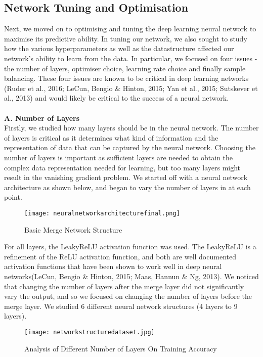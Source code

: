 \documentclass{article}
\begin{document}
\subsection{Network Tuning and Optimisation}
Next, we moved on to optimising and tuning the deep learning neural network to maximise its predictive ability. In tuning our network, we also sought to study how the various hyperparameters as well as the datastructure affected our network's ability to learn from the data. In particular, we focused on four issues - the number of layers, optimiser choice, learning rate choice and finally sample balancing. These four issues are known to be critical in deep learning networks (Ruder et al., 2016; LeCun, Bengio \& Hinton, 2015; Yan et al., 2015;  Sutskever et al., 2013) and would likely be critical to the success of a neural network.\\\\
\textbf{A. Number of Layers} \\
Firstly, we studied how many layers should be in the neural network. The number of layers is critical as it determines what kind of information and the representation of data that can be captured by the neural network. Choosing the number of layers is important as sufficient layers are needed to obtain the complex data representation needed for learning, but too many layers might result in the vanishing gradient problem. We started off with a neural network architecture as shown below, and began to vary the number of layers in at each point.
\begin{figure}[H]
\texttt{[image: neuralnetworkarchitecturefinal.png]}
\centering
\caption{Basic Merge Network Structure}
\end{figure}
For all layers, the LeakyReLU activation function was used. The LeakyReLU is a refinement of the ReLU activation function, and both are well documented activation functions that have been shown to work well in deep neural networks(LeCun, Bengio \& Hinton, 2015; Maas, Hannun \& Ng, 2013). We noticed that changing the number of layers after the merge layer did not significantly vary the output, and so we focused on changing the number of layers before the merge layer. We studied 6 different neural network structures (4 layers to 9 layers). 
\begin{figure}[H]
\texttt{[image: networkstructuredataset.jpg]}
\centering
\caption{Analysis of Different Number of Layers On Training Accuracy}
\end{figure}
\end{document}

